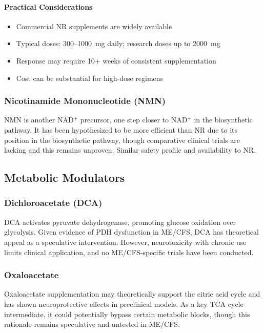 \paragraph{Practical Considerations}
\begin{itemize}
    \item Commercial NR supplements are widely available
    \item Typical doses: 300--1000~mg daily; research doses up to 2000~mg
    \item Response may require 10+ weeks of consistent supplementation
    \item Cost can be substantial for high-dose regimens
\end{itemize}

\subsubsection{Nicotinamide Mononucleotide (NMN)}

NMN is another NAD$^+$ precursor, one step closer to NAD$^+$ in the biosynthetic pathway. It has been hypothesized to be more efficient than NR due to its position in the biosynthetic pathway, though comparative clinical trials are lacking and this remains unproven. Similar safety profile and availability to NR.

\subsection{Metabolic Modulators}

\subsubsection{Dichloroacetate (DCA)}

DCA activates pyruvate dehydrogenase, promoting glucose oxidation over glycolysis. Given evidence of PDH dysfunction in ME/CFS, DCA has theoretical appeal as a speculative intervention. However, neurotoxicity with chronic use limits clinical application, and no ME/CFS-specific trials have been conducted.

\subsubsection{Oxaloacetate}

Oxaloacetate supplementation may theoretically support the citric acid cycle and has shown neuroprotective effects in preclinical models. As a key TCA cycle intermediate, it could potentially bypass certain metabolic blocks, though this rationale remains speculative and untested in ME/CFS.

